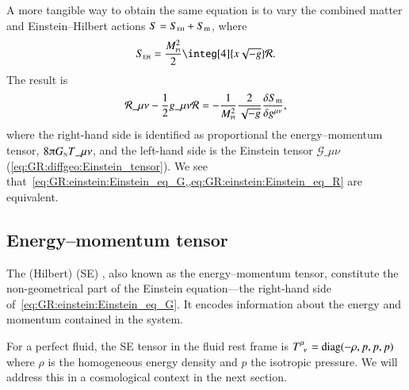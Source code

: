 A more tangible way to obtain the same equation is to vary the combined matter and Einstein--Hilbert actions $S =S_{\text{\tiny{EH}}} + S_\mathrm{m}$, where
\begin{equation}
    S\nped{EH} =  \frac{M\nped{Pl}^2}{2} \integ[4]{x\sqrt{-g} } \mathcal{R}.
\end{equation}
The result is
\begin{equation}\label{eq:GR:einstein:Einstein_eq_R}
    \mathcal{R}\_{\mu\nu} - \frac{1}{2}g\_{\mu\nu} \mathcal{R}= - \frac{1}{M\nped{Pl}^2} \frac{2}{\sqrt{-g}}\Fdv{S\ped{m}}{g\^{\mu\nu}},
\end{equation}
where the right-hand side is identified as proportional the energy--momentum tensor, $8\piGN T\_{\mu\nu}$, and the left-hand side is the Einstein tensor $\mathcal{G}\_{\mu\nu}$ (\cref{eq:GR:diffgeo:Einstein_tensor}). We see that~\cref{eq:GR:einstein:Einstein_eq_G,,eq:GR:einstein:Einstein_eq_R} are equivalent. %


\subsection{Energy--momentum tensor}\label{sec:GR:einstein:SE_tensor}
    The (Hilbert)  (SE) , also known as the energy--momentum tensor, constitute the non-geometrical part of the Einstein equation---the right-hand side of~\cref{eq:GR:einstein:Einstein_eq_G}. It encodes information about the energy and momentum contained in the system.

    For a perfect fluid, the SE tensor in the fluid rest frame is $T\indices{^\mu_\nu}= \text{diag}(-\rho, p, p, p)$ where $\rho$ is the homogeneous energy density and $p$ the isotropic pressure. We will address this in a cosmological context in the next section.


